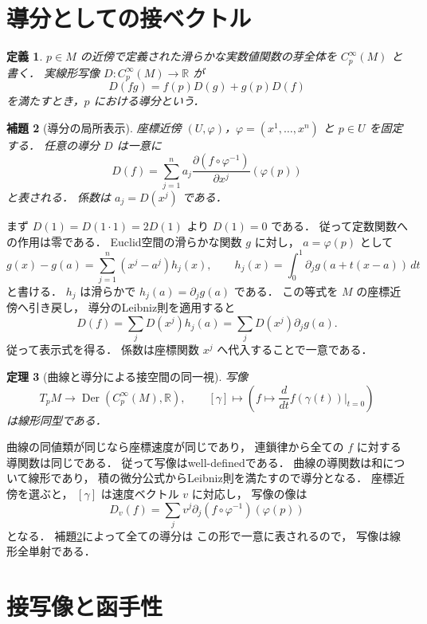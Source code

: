 \documentclass[a5paper,10pt,onecolumn]{jsarticle}
\makeatletter
\theoremstyle{mathnotetheorem}
\newtheorem{theorem}{定理}[section]
\newtheorem{definition}[theorem]{定義}
\newtheorem{lemma}[theorem]{補題}
\renewcommand{\proofname}{証明}
\renewenvironment{proof}[1][\proofname]{%
  \par\pushQED{\qed}\normalfont\topsep4\p@\@plus2\p@\relax
  \trivlist\item[\hskip\labelsep\bfseries #1]\ignorespaces
}{\popQED\endtrivlist\@endpefalse}
\makeatother
\begin{document}
\section{導分としての接ベクトル}

\begin{definition}
$p\in M$ の近傍で定義された滑らかな実数値関数の芽全体を
$C_p^\infty(M)$ と書く．
実線形写像
$D:C_p^\infty(M)\to\mathbb R$ が
\[
 D(fg)=f(p)D(g)+g(p)D(f)
\]
を満たすとき，$p$ における導分という．
\end{definition}

\begin{lemma}[導分の局所表示]\label{lem:derivation}
座標近傍 $(U,\varphi)$，$\varphi=(x^1,\dots,x^n)$ と
$p\in U$ を固定する．
任意の導分 $D$ は一意に
\[
 D(f)=\sum_{j=1}^na_j\frac{\partial(f\circ\varphi^{-1})}
 {\partial x^j}(\varphi(p))
\]
と表される．
係数は $a_j=D(x^j)$ である．
\end{lemma}
\begin{proof}
まず $D(1)=D(1\cdot1)=2D(1)$ より $D(1)=0$ である．
従って定数関数への作用は零である．
Euclid空間の滑らかな関数 $g$ に対し，
$a=\varphi(p)$ として
\[
 g(x)-g(a)=\sum_{j=1}^n(x^j-a^j)h_j(x),
 \qquad
 h_j(x)=\int_0^1\partial_jg(a+t(x-a))\,dt
\]
と書ける．
$h_j$ は滑らかで $h_j(a)=\partial_jg(a)$ である．
この等式を $M$ の座標近傍へ引き戻し，
導分のLeibniz則を適用すると
\[
 D(f)=\sum_jD(x^j)h_j(a)
 =\sum_jD(x^j)\partial_jg(a).
\]
従って表示式を得る．
係数は座標関数 $x^j$ へ代入することで一意である．
\end{proof}

\begin{theorem}[曲線と導分による接空間の同一視]
\label{thm:tangent-derivation}
写像
\[
 T_pM\longrightarrow\operatorname{Der}(C_p^\infty(M),\mathbb R),
 \qquad
 [\gamma]\longmapsto
 \left(f\longmapsto\frac d{dt}f(\gamma(t))\bigg|_{t=0}\right)
\]
は線形同型である．
\end{theorem}
\begin{proof}
曲線の同値類が同じなら座標速度が同じであり，
連鎖律から全ての $f$ に対する導関数は同じである．
従って写像はwell-definedである．
曲線の導関数は和について線形であり，
積の微分公式からLeibniz則を満たすので導分となる．
座標近傍を選ぶと，
$[\gamma]$ は速度ベクトル $v$ に対応し，
写像の像は
\[
 D_v(f)=\sum_jv^j\partial_j(f\circ\varphi^{-1})(\varphi(p))
\]
となる．
補題\ref{lem:derivation}によって全ての導分は
この形で一意に表されるので，
写像は線形全単射である．
\end{proof}

\section{接写像と函手性}
\end{document}
